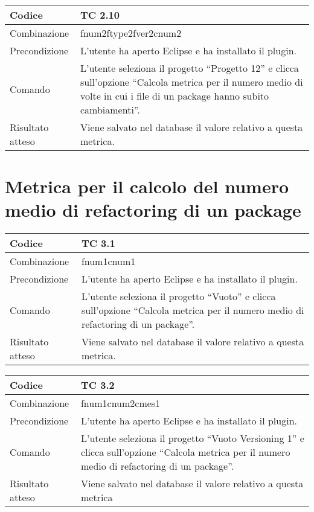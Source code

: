 \begin{table}[ht]
\begin{tabular}{|p{3cm}|p{9cm}|}
\hline
\cellcolor{lightgray}Codice				& TC 2.10								\\
\hline
\cellcolor{lightgray}Combinazione		& fnum2ftype2fver2cnum2									\\
\hline
\cellcolor{lightgray}Precondizione		& L'utente ha aperto Eclipse e ha installato il plugin.		\\
\hline
\cellcolor{lightgray}Comando			& L'utente seleziona il progetto ``Progetto 12''  e clicca sull'opzione ``Calcola metrica per il numero medio di volte in cui i file di un package hanno subito cambiamenti''.	\\
\hline
\cellcolor{lightgray}Risultato atteso	& Viene salvato nel database il valore relativo a questa metrica.\\
\hline
\end{tabular}
\end{table}
\clearpage

\section{Metrica per il calcolo del numero medio di refactoring di un package}
\begin{table}[ht]
\begin{tabular}{|p{3cm}|p{9cm}|}
\hline
\cellcolor{lightgray}Codice				& TC 3.1								\\
\hline
\cellcolor{lightgray}Combinazione		& fnum1cnum1									\\
\hline
\cellcolor{lightgray}Precondizione		& L'utente ha aperto Eclipse e ha installato il plugin.		\\
\hline
\cellcolor{lightgray}Comando			& L'utente seleziona il progetto ``Vuoto''  e clicca sull'opzione ``Calcola metrica per il numero medio di refactoring di un package''.	\\
\hline
\cellcolor{lightgray}Risultato atteso	& Viene salvato nel database il valore relativo a questa metrica.\\
\hline
\end{tabular}
\end{table}

\begin{table}[ht]
\begin{tabular}{|p{3cm}|p{9cm}|}
\hline
\cellcolor{lightgray}Codice				& TC 3.2								\\
\hline
\cellcolor{lightgray}Combinazione		& fnum1cnum2cmes1 									\\
\hline
\cellcolor{lightgray}Precondizione		& L'utente ha aperto Eclipse e ha installato il plugin.				\\
\hline
\cellcolor{lightgray}Comando			& L'utente seleziona il progetto ``Vuoto Versioning 1''  e clicca sull'opzione ``Calcola metrica per il numero medio di refactoring di un package''.	\\
\hline
\cellcolor{lightgray}Risultato atteso	& Viene salvato nel database il valore relativo a questa metrica	\\
\hline
\end{tabular}
\end{table}

